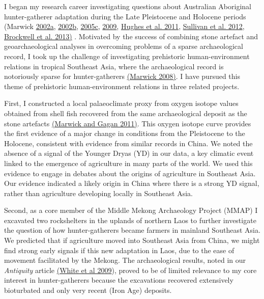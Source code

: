 \documentclass[11pt,article,oneside]{memoir}
\begin{document}
I began my research career investigating questions about Australian Aboriginal hunter-gatherer adaptation during the Late Pleistocene and Holocene periods (Marwick {\href{http://hdl.handle.net/1885/42085}{2002a}}, {\href{http://dx.doi.org/10.6084/m9.figshare.765251}{2002b}}, {\href{http://faculty.washington.edu/bmarwick/PDFs/Marwick_2005_Marillana_A.pdf}{2005c}}, \href{http://faculty.washington.edu/bmarwick/PDFs/Marwick_2009_AO_Pilbara.pdf}{2009}, \href{http://faculty.washington.edu/bmarwick/PDFs/Hughes_et_al_2011_JASSA.pdf}{Hughes et al. 2011}, \href{http://faculty.washington.edu/bmarwick/PDFs/Sullivan_et_al_2012_OSL_dates_ODX.pdf}{Sullivan et al. 2012}, \href{http://faculty.washington.edu/bmarwick/PDFs/Brockwell_et_al_2013_AA.pdf}{Brockwell et al. 2013)} . Motivated by the success of combining stone artefact and geoarchaeological analyses in overcoming problems of a sparse archaeological record, I took up the challenge of  investigating prehistoric human-environment relations in tropical Southeast Asia, where the archaeological record is notoriously sparse for hunter-gatherers {\href{http://dx.doi.org/10.6084/m9.figshare.765252}{(Marwick 2008)}}. I have pursued this theme of prehistoric human-environment relations in three related projects.

First, I constructed a local palaeoclimate proxy from oxygen isotope values obtained from shell fish recovered from the same archaeological deposit as the stone artefacts {\href{http://faculty.washington.edu/bmarwick/PDFs/Marwick_and_Gagan_2011_QSR.pdf}{(Marwick and Gagan 2011)}}. This oxygen isotope curve provides the first evidence of a major change in conditions from the Pleistocene to the Holocene, consistent with evidence from similar records in China. We noted the absence of a signal of the Younger Dryas (YD) in our data, a key climatic event linked to the emergence of agriculture in many parts of the world. We used this evidence to engage in debates about the origins of agriculture in Southeast Asia. Our evidence indicated a likely origin in China where there is a strong YD signal, rather than agriculture developing locally in Southeast Asia.

Second, as a core member of the Middle Mekong Archaeology Project (MMAP) I excavated two rockshelters in the uplands of northern Laos to further investigate the question of how hunter-gatherers became farmers in mainland Southeast Asia. We predicted that if agriculture moved into Southeast Asia from China, we might find strong early signals if this new adaptation in Laos, due to the ease of movement facilitated by the Mekong.  The archaeological results, noted in our \textit{Antiquity} article {\href{http://antiquity.ac.uk/projgall/white/}{(White et al 2009})}, proved to be of limited relevance to my core interest in hunter-gatherers because the excavations recovered extensively bioturbated and only very recent (Iron Age) deposits. 
\end{document}
